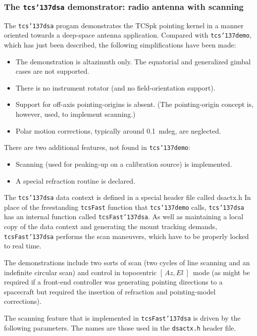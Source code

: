 \documentclass[12pt,fleqn,twoside]{article}
\renewcommand{\_}{{\tt\char'137}}     %
\newcommand{\azel}      {$[\,Az,El~]$}
\begin{document}
\newpage
\subsubsection{The {\tt tcs\_dsa} demonstrator: radio antenna with scanning}
\label{tcs_dsa}

The {\tt tcs\_dsa} progam demonstrates the
TCSpk pointing kernel in a manner oriented towards a
deep-space antenna application.  Compared with {\tt tcs\_demo}, which
has just been described, the following simplifications have been made:
\begin{itemize}
\item The demonstration is altazimuth only.  The equatorial
      and generalized gimbal cases are not supported.
\item There is no instrument rotator (and no field-orientation support).
\item Support for off-axis pointing-origins is absent.  (The
      pointing-origin concept is, however, used, to implement
      scanning.)
\item Polar motion corrections, typically around 0.1~mdeg,
      are neglected.
\end{itemize}
There are two additional features, not found in {\tt tcs\_demo}:
\begin{itemize}
\item Scanning (used for peaking-up on a calibration source) is
      implemented.
\item A special refraction routine is declared.
\end{itemize}
The {\tt tcs\_dsa} data context is defined in a special header file
called dsactx.h
In place of the freestanding {\tt tcsFast} function that {\tt tcs\_demo}
calls, {\tt tcs\_dsa} has an internal function called {\tt tcsFast\_dsa}.
As well as maintaining a local copy of the data context and generating
the mount tracking demands, {\tt tcsFast\_dsa} performs the scan
maneuvers, which have to be properly locked to real time.

The demonstrations include two sorts of scan (two cycles of
line scanning and an indefinite circular scan)
and control in topocentric \azel\ mode (as might be required
if a front-end controller was generating pointing directions to
a spacecraft but required the insertion of refraction
and pointing-model corrections).

The scanning feature that is implemented in {\tt tcsFast\_dsa} is
driven by the following parameters.  The names are those used in the
{\tt dsactx.h} header file.
\end{document}
